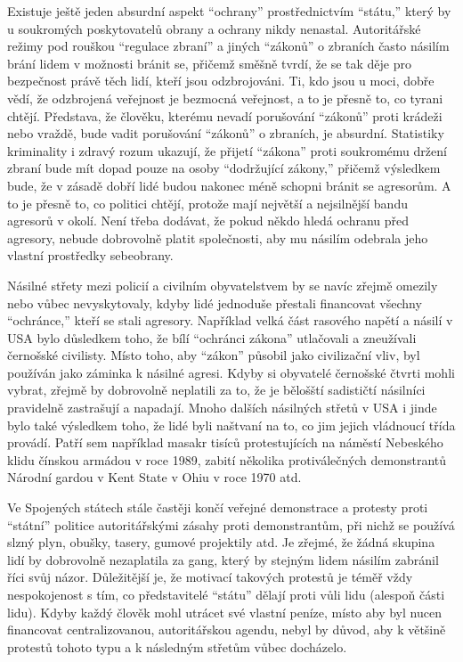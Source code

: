 \documentclass{book}
\begin{document}
Existuje ještě jeden absurdní aspekt \enquote{ochrany} prostřednictvím \enquote{státu,} který by u soukromých poskytovatelů obrany a ochrany nikdy nenastal. Autoritářské režimy pod rouškou \enquote{regulace zbraní} a jiných \enquote{zákonů} o zbraních často násilím brání lidem v možnosti bránit se, přičemž směšně tvrdí, že se tak děje pro bezpečnost právě těch lidí, kteří jsou odzbrojováni. Ti, kdo jsou u moci, dobře vědí, že odzbrojená veřejnost je bezmocná veřejnost, a to je přesně to, co tyrani chtějí. Představa, že člověku, kterému nevadí porušování \enquote{zákonů} proti krádeži nebo vraždě, bude vadit porušování \enquote{zákonů} o zbraních, je absurdní. Statistiky kriminality i zdravý rozum ukazují, že přijetí \enquote{zákona} proti soukromému držení zbraní bude mít dopad pouze na osoby \enquote{dodržující zákony,} přičemž výsledkem bude, že v zásadě dobří lidé budou nakonec méně schopni bránit se agresorům. A to je přesně to, co politici chtějí, protože mají největší a nejsilnější bandu agresorů v okolí. Není třeba dodávat, že pokud někdo hledá ochranu před agresory, nebude dobrovolně platit společnosti, aby mu násilím odebrala jeho vlastní prostředky sebeobrany.

Násilné střety mezi policií a civilním obyvatelstvem by se navíc zřejmě omezily nebo vůbec nevyskytovaly, kdyby lidé jednoduše přestali financovat všechny \enquote{ochránce,} kteří se stali agresory. Například velká část rasového napětí a násilí v USA bylo důsledkem toho, že bílí \enquote{ochránci zákona} utlačovali a zneužívali černošské civilisty. Místo toho, aby \enquote{zákon} působil jako civilizační vliv, byl používán jako záminka k násilné agresi. Kdyby si obyvatelé černošské čtvrti mohli vybrat, zřejmě by dobrovolně neplatili za to, že je bělošští sadističtí násilníci pravidelně zastrašují a napadají. Mnoho dalších násilných střetů v USA i jinde bylo také výsledkem toho, že lidé byli naštvaní na to, co jim jejich vládnoucí třída provádí. Patří sem například masakr tisíců protestujících na náměstí Nebeského klidu čínskou armádou v roce 1989, zabití několika protiválečných demonstrantů Národní gardou v Kent State v Ohiu v roce 1970 atd.

Ve Spojených státech stále častěji končí veřejné demonstrace a protesty proti \enquote{státní} politice autoritářskými zásahy proti demonstrantům, při nichž se používá slzný plyn, obušky, tasery, gumové projektily atd. Je zřejmé, že žádná skupina lidí by dobrovolně nezaplatila za gang, který by stejným lidem násilím zabránil říci svůj názor. Důležitější je, že motivací takových protestů je téměř vždy nespokojenost s tím, co představitelé \enquote{státu} dělají proti vůli lidu (alespoň části lidu). Kdyby každý člověk mohl utrácet své vlastní peníze, místo aby byl nucen financovat centralizovanou, autoritářskou agendu, nebyl by důvod, aby k většině protestů tohoto typu a k následným střetům vůbec docházelo.
\end{document}
